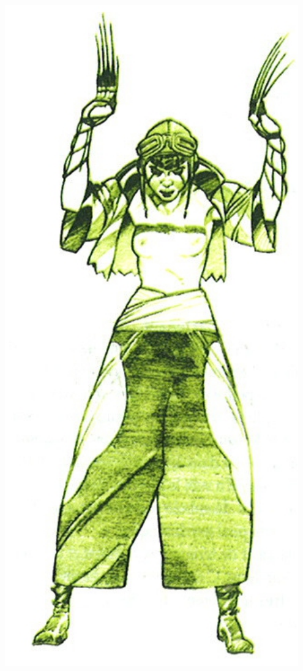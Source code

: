 \documentclass[40pt,twoside,a4paper]{article}
\begin{document}
\begin{landscape}
\begin{minipage}[ht]{0.10\textwidth}
			\includegraphics[width=0.95\textwidth]{../img/personnageIrinaToss.jpg} ~\\~\\

\end{minipage}
\end{landscape}
\end{document}
